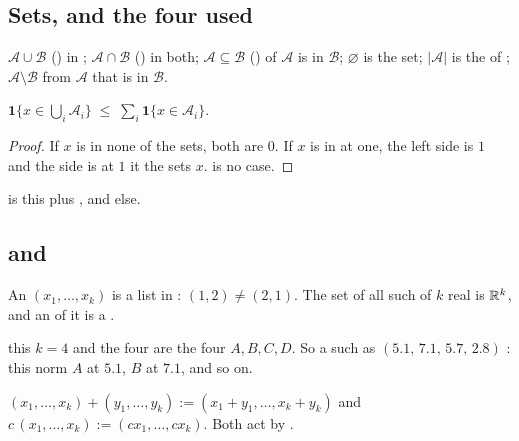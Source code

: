 \subsection{Sets, and the four  used}

$\mathcal{A}\cup\mathcal{B}$ ()   in ;
$\mathcal{A}\cap\mathcal{B}$ ()  in both;
$\mathcal{A}\subseteq\mathcal{B}$ ()    of $\mathcal{A}$
is in $\mathcal{B}$; $\varnothing$ is the  set; $|\mathcal{A}|$ is the 
of ; $\mathcal{A}\setminus\mathcal{B}$  from $\mathcal{A}$
 that is in $\mathcal{B}$.

\begin{lemma}
\label{lem:union}
$\mathbf{1}\{x\in\bigcup_i \mathcal{A}_i\}\;\le\;\sum_i \mathbf{1}\{x\in\mathcal{A}_i\}$.
\end{lemma}
\begin{proof}
If $x$ is in none of the sets, both  are $0$. If $x$ is in at  one, the
left side is $1$ and the  side is at  $1$  it  the sets
 $x$.  is no  case.
\end{proof}
 is this  plus  , and  else.

\subsection{ and }

An \emph{ } $(x_1,\dots,x_k)$ is a list in   :
$(1,2)\neq(2,1)$. The set of all such  of $k$ real  is  $\mathbb{R}^k$,
and an  of it is a \emph{}.

 this  $k=4$ and the four  are the four 
 $A,B,C,D$. So a  such as $(5.1,\,7.1,\,5.7,\,2.8)$ : this
norm   $A$ at $5.1$, $B$ at $7.1$, and so on.

\begin{definition}
$(x_1,\dots,x_k)+(y_1,\dots,y_k) := (x_1+y_1,\dots,x_k+y_k)$ and
$c\,(x_1,\dots,x_k) := (cx_1,\dots,cx_k)$. Both act  by .
\end{definition}

